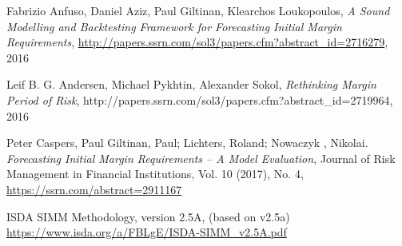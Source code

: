 \documentclass[12pt, a4paper]{article}
\begin{document}
\begin{thebibliography}{*}
 Fabrizio Anfuso, Daniel Aziz, Paul Giltinan, Klearchos Loukopoulos, {\em A Sound Modelling and
    Backtesting Framework for Forecasting Initial Margin Requirements},
  \url{http://papers.ssrn.com/sol3/papers.cfm?abstract_id=2716279}, 2016

 Leif B. G. Andersen, Michael Pykhtin, Alexander Sokol, {\em Rethinking Margin Period of Risk},
  http://papers.ssrn.com/sol3/papers.cfm?abstract\_id=2719964, 2016

 Peter Caspers, Paul Giltinan, Paul; Lichters, Roland; Nowaczyk , Nikolai. {\em Forecasting Initial Margin Requirements – A Model Evaluation}, Journal of Risk Management in Financial Institutions, Vol. 10 (2017), No. 4, \url{https://ssrn.com/abstract=2911167}

 ISDA SIMM Methodology, version 2.5A, (based on v2.5a) \\
  \url{https://www.isda.org/a/FBLgE/ISDA-SIMM\_v2.5A.pdf}

  
\end{thebibliography}

\newpage
{}
\listoftodos[Todo]
\end{document}
